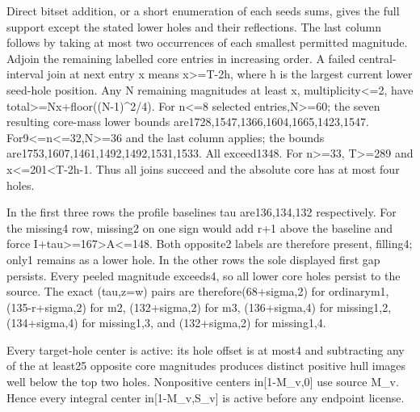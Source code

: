 \documentclass[10pt,a4paper]{article}
\theoremstyle{definition}
\begin{document}
Direct bitset addition,\allowbreak{} or a short enumeration of each
seed\textquotesingle s sums,\allowbreak{} gives the full support except the stated
lower holes and their reflections. The last column follows by taking at
most two occurrences of each smallest permitted magnitude. Adjoin the
remaining labelled core entries in increasing order. A failed
central-interval join at next entry x means x\textgreater=\allowbreak{}T-2h,\allowbreak{} where h
is the largest current lower seed-hole position. Any N remaining
magnitudes at least x,\allowbreak{} multiplicity\textless=\allowbreak{}2,\allowbreak{} have
total\textgreater=\allowbreak{}Nx+\allowbreak{}floor((N-1)\^{}2/4). For n\textless=\allowbreak{}8 selected
entries,\allowbreak{}N\textgreater=\allowbreak{}60; the seven resulting core-mass lower bounds
are1728,\allowbreak{}1547,\allowbreak{}1366,\allowbreak{}1604,\allowbreak{}1665,\allowbreak{}1423,\allowbreak{}1547.
For9\textless=\allowbreak{}n\textless=\allowbreak{}32,\allowbreak{}N\textgreater=\allowbreak{}36 and the last column
applies; the bounds are1753,\allowbreak{}1607,\allowbreak{}1461,\allowbreak{}1492,\allowbreak{}1492,\allowbreak{}1531,\allowbreak{}1533. All
exceed1348. For n\textgreater=\allowbreak{}33,\allowbreak{} T\textgreater=\allowbreak{}289 and
x\textless=\allowbreak{}201\textless T-2h-1. Thus all joins succeed and the absolute
core has at most four holes.

In the first three rows the profile baselines tau are136,\allowbreak{}134,\allowbreak{}132
respectively. For the missing4 row,\allowbreak{} missing2 on one sign would add r+\allowbreak{}1
above the baseline and force
I+\allowbreak{}tau\textgreater=\allowbreak{}167\textgreater A\textless=\allowbreak{}148. Both opposite2 labels
are therefore present,\allowbreak{} filling4; only1 remains as a lower hole. In the
other rows the sole displayed first gap persists. Every peeled magnitude
exceeds4,\allowbreak{} so all lower core holes persist to the source. The exact
(tau,\allowbreak{}z=\allowbreak{}w) pairs are therefore(68+\allowbreak{}sigma,\allowbreak{}2) for ordinarym1,\allowbreak{}
(135-r+\allowbreak{}sigma,\allowbreak{}2) for m2,\allowbreak{} (132+\allowbreak{}sigma,\allowbreak{}2) for m3,\allowbreak{} (136+\allowbreak{}sigma,\allowbreak{}4) for
missing1,\allowbreak{}2,\allowbreak{} (134+\allowbreak{}sigma,\allowbreak{}4) for missing1,\allowbreak{}3,\allowbreak{} and (132+\allowbreak{}sigma,\allowbreak{}2) for
missing1,\allowbreak{}4.

Every target-hole center is active: its hole offset is at most4 and
subtracting any of the at least25 opposite core magnitudes produces
distinct positive hull images well below the top two holes. Nonpositive
centers in{[}1-M\_\allowbreak{}v,\allowbreak{}0{]} use source M\_\allowbreak{}v. Hence every integral center
in{[}1-M\_\allowbreak{}v,\allowbreak{}S\_\allowbreak{}v{]} is active before any endpoint license.
\end{document}

